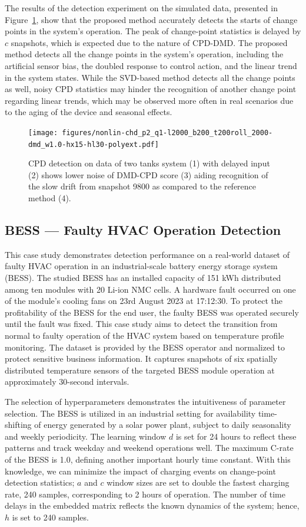 The results of the detection experiment on the simulated data, presented in Figure~\ref{fig: non-linear}, show that the proposed method accurately detects the starts of change points in the system's operation. The peak of change-point statistics is delayed by \(c\) snapshots, which is expected due to the nature of CPD-DMD. The proposed method detects all the change points in the system's operation, including the artificial sensor bias, the doubled response to control action, and the linear trend in the system states. While the SVD-based method detects all the change points as well, noisy CPD statistics may hinder the recognition of another change point regarding linear trends, which may be observed more often in real scenarios due to the aging of the device and seasonal effects.

\begin{figure}[H]
	\centering
	\texttt{[image: figures/nonlin-chd\_p2\_q1-l2000\_b200\_t200roll\_2000-dmd\_w1.0-hx15-hl30-polyext.pdf]}
	\caption{CPD detection on data of two tanks system (1) with delayed input (2) shows lower noise of DMD-CPD score (3) aiding recognition of the slow drift from snapshot 9800 as compared to the reference method (4).}\label{fig: non-linear}
\end{figure}

\subsection{BESS --- Faulty HVAC Operation Detection}
This case study demonstrates detection performance on a real-world dataset of faulty HVAC operation in an industrial-scale battery energy storage system (BESS). The studied BESS has an installed capacity of 151 kWh distributed among ten modules with 20 Li-ion NMC cells. A hardware fault occurred on one of the module's cooling fans on 23rd August 2023 at 17:12:30. To protect the profitability of the BESS for the end user, the faulty BESS was operated securely until the fault was fixed. This case study aims to detect the transition from normal to faulty operation of the HVAC system based on temperature profile monitoring. The dataset is provided by the BESS operator and normalized to protect sensitive business information. It captures snapshots of six spatially distributed temperature sensors of the targeted BESS module operation at approximately 30-second intervals.

The selection of hyperparameters demonstrates the intuitiveness of parameter selection. The BESS is utilized in an industrial setting for availability time-shifting of energy generated by a solar power plant, subject to daily seasonality and weekly periodicity. The learning window \(d\) is set for 24 hours to reflect these patterns and track weekday and weekend operations well. The maximum C-rate of the BESS is 1.0, defining another important hourly time constant. With this knowledge, we can minimize the impact of charging events on change-point detection statistics; \(a\) and \(c\) window sizes are set to double the fastest charging rate, 240 samples, corresponding to 2 hours of operation. The number of time delays in the embedded matrix reflects the known dynamics of the system; hence, \(h\) is set to 240 samples.

